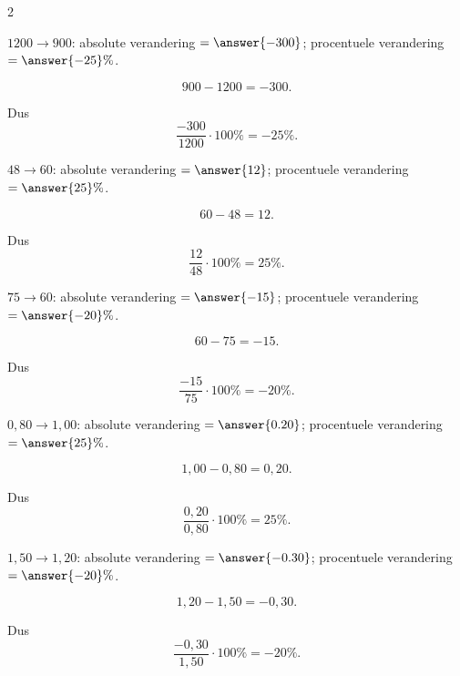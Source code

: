 \documentclass{ximera}
\begin{document}
\begin{oefening}{\oefB\ESS}
\begin{multicols}{2}
    
    \begin{question}
    $1200\to900$: absolute verandering $=\answer{-300}$; procentuele verandering $=\answer{-25}\%$.
    
    \begin{oplossing}
    \[
    900-1200=-300.
    \]
    
    Dus
    \[
    \dfrac{-300}{1200}\cdot100\%=-25\%.
    \]
    \end{oplossing}
    \end{question}
    
    
    \begin{question}
    $48\to60$: absolute verandering $=\answer{12}$; procentuele verandering $=\answer{25}\%$.
    
    \begin{oplossing}
    \[
    60-48=12.
    \]
    
    Dus
    \[
    \dfrac{12}{48}\cdot100\%=25\%.
    \]
    \end{oplossing}
    \end{question}
    
    
    \begin{question}
    $75\to60$: absolute verandering $=\answer{-15}$; procentuele verandering $=\answer{-20}\%$.
    
    \begin{oplossing}
    \[
    60-75=-15.
    \]
    
    Dus
    \[
    \dfrac{-15}{75}\cdot100\%=-20\%.
    \]
    \end{oplossing}
    \end{question}
    
    
    \begin{question}
    $0{,}80\to1{,}00$: absolute verandering $=\answer{0.20}$; procentuele verandering $=\answer{25}\%$.
    
    \begin{oplossing}
    \[
    1{,}00-0{,}80=0{,}20.
    \]
    
    Dus
    \[
    \dfrac{0{,}20}{0{,}80}\cdot100\%=25\%.
    \]
    \end{oplossing}
    \end{question}
    
    
    \begin{question}
    $1{,}50\to1{,}20$: absolute verandering $=\answer{-0.30}$; procentuele verandering $=\answer{-20}\%$.
    
    \begin{oplossing}
    \[
    1{,}20-1{,}50=-0{,}30.
    \]
    
    Dus
    \[
    \dfrac{-0{,}30}{1{,}50}\cdot100\%=-20\%.
    \]
    \end{oplossing}
    \end{question}
    
    \end{multicols}
    
    \end{oefening}
    
\end{document}
